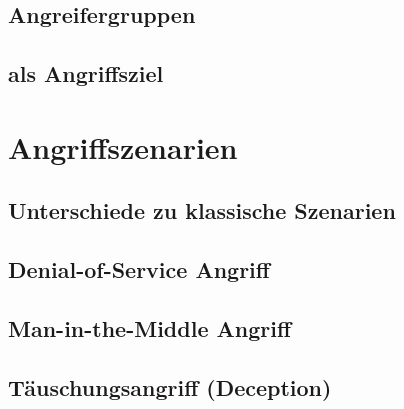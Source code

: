 \documentclass[final,bibliography=totocnumbered]{include/sikseminar}
\begin{document}


\subsection{Angreifergruppen}\label{subsec:angreifergruppen}

\subsection{ als Angriffsziel}\label{subsec:angriffsziel}

\section{Angriffszenarien}\label{sec:angriffszenarien}
\subsection{Unterschiede zu klassische Szenarien}\label{subsec:klassisch}
\subsection{Denial-of-Service Angriff}\label{subsec:dos}
\subsection{Man-in-the-Middle Angriff}\label{subsec:mitm}
\subsection{T\"auschungsangriff (Deception)}\label{subsec:tauschung} %
\end{document}
